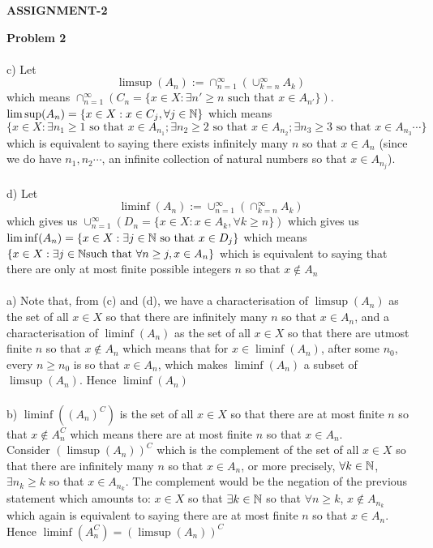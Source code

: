 \documentclass[../Main.tex]{subfiles}
\begin{document}
\begin{center}
    \textbf{ASSIGNMENT-2}
\end{center}

\textbf{Problem 2}
\\\\ c) Let $$\limsup(A_n):=\cap_{n=1}^{\infty}(\cup_{k=n}^{\infty}A_k) $$ which means $\cap_{n=1}^{\infty}(C_n=\{x \in X: \exists n' \geq n \text{ such that }x \in A_{n'}\})$. $\limsup(A_n)=\{x \in X: x \in C_j,  \forall j \in \mathbb N\}$ which means $\{x \in X: \exists n_1 \geq 1 \text{ so that } x \in A_{n_1}; \exists n_2 \geq 2  \text{ so that } x \in A_{n_2}; \exists n_3 \geq 3 \text{ so that } x \in A_{n_3} \cdots \}$
which is equivalent to saying there exists infinitely many $n$ so that $x \in A_n$ (since we do have $n_1,n_2 \cdots$, an infinite collection of natural numbers so that $x \in A_{n_j}$).
\\\\ d) Let $$\liminf(A_n):=\cup_{n=1}^{\infty}(\cap_{k=n}^{\infty}A_k)$$ which gives us $\cup_{n=1}^{\infty}(D_n=\{x \in X: x \in A_k, \forall k \geq n\})$ which gives us $\liminf(A_n)=\{x \in X: \exists j \in \mathbb N \text{ so that } x \in D_j\}$ which means $\{x \in X: \exists j \in \mathbb N \text{such that } \forall n \geq j, x \in A_n\}$ which is equivalent to saying that there are only at most finite possible integers $n$ so that $x \not \in A_n$ 
\\\\ a) Note that, from (c) and (d), we have a characterisation of $\limsup(A_n)$ as the set of all $x \in X$ so that there are infinitely many $n$ so that $x \in A_n$, and a characterisation of $\liminf(A_n)$ as the set of all $x \in X$ so that there are utmost finite $n$ so that $x \not \in A_n$ which means that for $x \in \liminf(A_n)$, after some $n_0$, every $n \geq n_0$ is so that $x \in A_n$, which makes $\liminf(A_n)$ a subset of $\limsup(A_n)$.
 Hence $\liminf(A_n)$
 \\\\ b) $\liminf((A_n)^C)$ is the set of all $x \in X$ so that there are at most finite $n$ so that $x \not \in A_n^C$ which means there are at most finite $n$ so that $x \in A_n$.
 \\ Consider $(\limsup(A_n))^C$ which is the complement of the set of all $x \in X$ so that there are infinitely many $n$ so that $x \in A_n$, or more precisely, $\forall k \in \mathbb N$, $\exists n_k \geq k$ so that $x \in A_{n_k}$. The complement would be the negation of the previous statement which amounts to: $x \in X$ so that $\exists k \in \mathbb N$ so that $\forall n\geq k$, $x \not \in A_{n_k}$ which again is equivalent to saying there are at most finite $n$ so that $x \in A_n$. Hence $\liminf(A_n^C)=(\limsup(A_n))^C$
\end{document}
